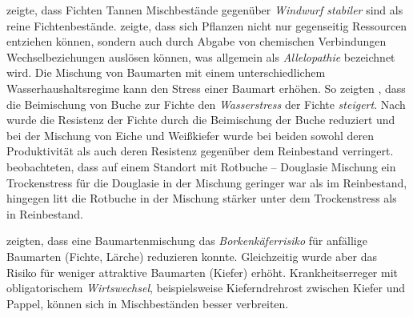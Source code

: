\documentclass[twocolumn]{scrartcl}
\begin{document}
\cite{schmidtVogt1987Sturmstabilitaet} zeigte, dass Fichten Tannen
Mischbestände gegenüber \emph{Windwurf stabiler} sind als reine
Fichtenbestände. \cite{molisch1937allelopathie} zeigte, dass sich
Pflanzen nicht nur gegenseitig Ressourcen entziehen können, sondern
auch durch Abgabe von chemischen Verbindungen Wechselbeziehungen
auslösen können, was allgemein als \emph{Allelopathie} bezeichnet
wird.  Die Mischung von Baumarten mit einem unterschiedlichem
Wasserhaushaltsregime kann den Stress einer Baumart erhöhen. So
zeigten \cite{schume2004wasserFichteBuche}, dass die Beimischung von
Buche zur Fichte den \emph{Wasserstress} der Fichte
\emph{steigert}. Nach \cite{nothdurft2020mischbestand} wurde die
Resistenz der Fichte durch die Beimischung der Buche reduziert und bei
der Mischung von Eiche und Weißkiefer wurde bei beiden sowohl deren
Produktivität als auch deren Resistenz gegenüber dem Reinbestand
verringert. \cite{thurm2016mischungDougBuStress} beobachteten, dass
auf einem Standort mit Rotbuche -- Douglasie Mischung ein
Trockenstress für die Douglasie in der Mischung geringer war als im
Reinbestand, hingegen litt die Rotbuche in der Mischung stärker unter
dem Trockenstress als in Reinbestand.

\cite{sylvie2021mischwaldInsekten} zeigten, dass eine
Baumartenmischung das \emph{Borkenkäferrisiko} für anfällige Baumarten
(Fichte, Lärche) reduzieren konnte. Gleichzeitig wurde aber das Risiko
für weniger attraktive Baumarten (Kiefer) erhöht. Krankheitserreger
mit obligatorischem \emph{Wirtswechsel}, beispielsweise
Kieferndrehrost zwischen Kiefer und Pappel, können sich in
Mischbeständen besser verbreiten.
\end{document}
